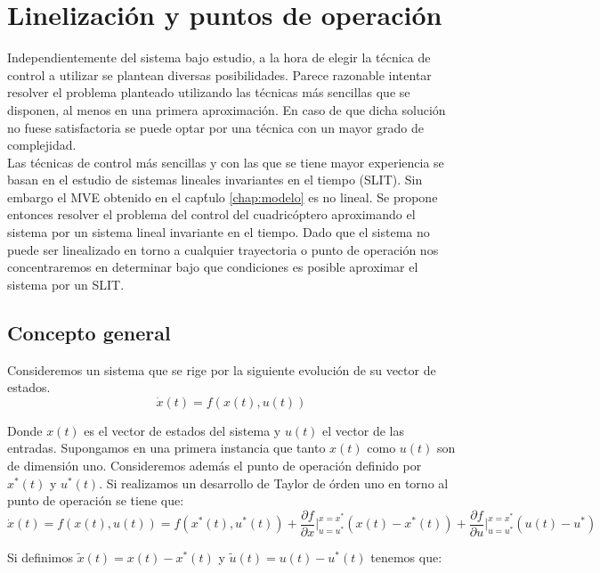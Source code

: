 \documentclass[main]{subfiles}
\begin{document}
\chapter{Linelizaci\'on y puntos de operaci\'on}
\label{chap:linealizacion}

Independientemente del sistema bajo estudio, a la hora de elegir la t\'ecnica de control a utilizar se plantean diversas posibilidades. Parece razonable intentar resolver el problema planteado utilizando las t\'ecnicas m\'as sencillas que se disponen, al menos en una primera aproximaci\'on. En caso de que dicha soluci\'on no fuese satisfactoria se puede optar por una t\'ecnica con un mayor grado de complejidad.\\ 

Las t\'ecnicas de control m\'as sencillas y con las que se tiene mayor experiencia se basan en el estudio de sistemas lineales invariantes en el tiempo (SLIT). Sin embargo el MVE obtenido en el cap\'tulo \ref{chap:modelo} es no lineal. Se propone entonces resolver el problema del control del cuadric\'optero aproximando el sistema por un sistema lineal invariante en el tiempo. Dado que el sistema no puede ser linealizado en torno a cualquier trayectoria o punto de operaci\'on nos concentraremos en determinar bajo que condiciones es posible aproximar el sistema por un SLIT.

\section{Concepto general}
Consideremos un sistema que se rige por la siguiente evoluci\'on de su vector de estados. 
\begin{equation}
\dot{x}(t)=f(x(t),u(t))
\end{equation}

Donde $x(t)$ es el vector de estados del sistema y $u(t)$ el vector de las entradas. Supongamos en una primera instancia que tanto $x(t)$ como $u(t)$ son de dimensi\'on uno. Consideremos adem\'as el punto de operaci\'on definido por $x^*(t)$ y $u^*(t)$. Si realizamos un desarrollo de Taylor de \'orden uno en torno al punto de operaci\'on se tiene que:
\begin{equation}
\dot{x}(t)=f(x(t),u(t))=f(x^*(t),u^*(t))+\frac{\partial f}{\partial x}\vert_{u=u^*}^{x=x^*}(x(t)-x^*(t))+\frac{\partial f}{\partial u}\vert_{u=u^*}^{x=x^*}(u(t)-u^*)
\end{equation}

Si definimos $\tilde{x}(t)=x(t)-x^*(t)$ y $\tilde{u}(t)=u(t)-u^*(t)$ tenemos que:
\end{document}
